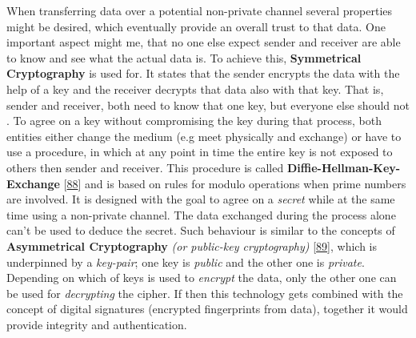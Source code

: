 \documentclass[12pt,english,a4paper,titlepage,cleardoublepage=empty,dottedtoc]{report}
\begin{document}
When transferring data over a potential non-private channel several
properties might be desired, which eventually provide an overall trust
to that data. One important aspect might me, that no one else expect
sender and receiver are able to know and see what the actual data is. To
achieve this, \textbf{Symmetrical Cryptography} is used for. It states
that the sender encrypts the data with the help of a key and the
receiver decrypts that data also with that key. That is, sender and
receiver, both need to know that one key, but everyone else should not .
To agree on a key without compromising the key during that process, both
entities either change the medium (e.g meet physically and exchange) or
have to use a procedure, in which at any point in time the entire key is
not exposed to others then sender and receiver. This procedure is called
\textbf{Diffie-Hellman-Key-Exchange}
{[}\protect\hyperlink{ref-paper_1976_d-h-key-exchange}{88}{]} and is
based on rules for modulo operations when prime numbers are involved. It
is designed with the goal to agree on a \emph{secret} while at the same
time using a non-private channel. The data exchanged during the process
alone can't be used to deduce the secret. Such behaviour is similar to
the concepts of
\textbf{\protect\hypertarget{link_asym-crypto}{}{Asymmetrical
Cryptography}} \emph{(or public-key cryptography)}
{[}\protect\hyperlink{ref-book_2014_chapter-9-1-public-key-crypto}{89}{]},
which is underpinned by a \emph{key-pair}; one key is \emph{public} and
the other one is \emph{private}. Depending on which of keys is used to
\emph{encrypt} the data, only the other one can be used for
\emph{decrypting} the cipher. If then this technology gets combined with
the concept of digital signatures (encrypted fingerprints from data),
together it would provide integrity and authentication.
\end{document}
